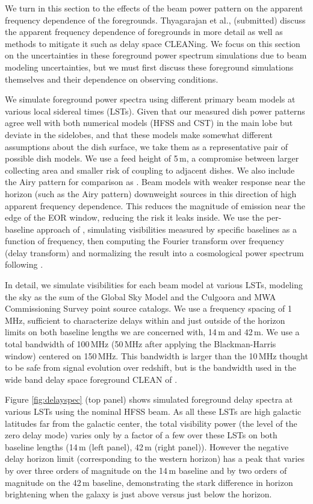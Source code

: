 \documentclass{emulateapj}
\begin{document}
We turn in this section to the effects of the beam power pattern on the apparent frequency dependence of the foregrounds. Thyagarajan et al., (submitted) discuss the apparent frequency dependence of foregrounds in more detail as well as methods to mitigate it such as delay space CLEANing. We focus on this section on the uncertainties in these foreground power spectrum simulations due to beam modeling uncertainties, but we must first discuss these foreground simulations themselves and their dependence on observing conditions. 

We simulate foreground power spectra using different primary beam models at various local sidereal times (LSTs). Given that our measured dish power patterns agree well with both numerical models (HFSS and CST) in the main lobe but deviate in the sidelobes, and that these models make somewhat different assumptions about the dish surface, we take them as a representative pair of possible dish models. We use a feed height of 5\,m, a compromise between larger collecting area and smaller risk of coupling to adjacent dishes. We also include the Airy pattern for comparison as \citet{nithya15}. Beam models with weaker response near the horizon (such as the Airy pattern) downweight sources in this direction of high apparent frequency dependence. This reduces the magnitude of emission near the edge of the EOR window, reducing the risk it leaks inside. We use the per-baseline approach of \citet{parsons12a,parsons12b}, simulating visibilities measured by specific baselines as a function of frequency, then computing the Fourier transform over frequency (delay transform) and normalizing the result into a cosmological power spectrum following \citet{nithya15}. 

In detail, we simulate visibilities for each beam model at various LSTs, modeling the sky as the sum of the Global Sky Model \citep{gsm} and the Culgoora \citep{Slee1995} and MWA Commissioning Survey \citep{MWACS} point source catalogs. We use a frequency spacing of 1\,MHz, sufficient to characterize delays within and just outside of the horizon limits on both baseline lengths we are concerned with, 14\,m and 42\,m. We use a total bandwidth of 100\,MHz (50\,MHz after applying the Blackman-Harris window) centered on 150\,MHz. This bandwidth is larger than the 10\,MHz thought to be safe from signal evolution over redshift, but is the bandwidth used in the wide band delay space foreground CLEAN of \citet{paper32,paper64}.

Figure \ref{fig:delayspec} (top panel) shows simulated foreground delay spectra at various LSTs using the nominal HFSS beam. As all these LSTs are high galactic latitudes far from the galactic center, the total visibility power (the level of the zero delay mode) varies only by a factor of a few over these LSTs on both baseline lengths (14\,m (left panel), 42\,m (right panel)). However the negative delay horizon limit (corresponding to the western horizon) has a peak that varies by over three orders of magnitude on the 14\,m baseline and by two orders of magnitude on the 42\,m baseline, demonstrating the stark difference in horizon brightening when the galaxy is just above versus just below the horizon. 
\end{document}
